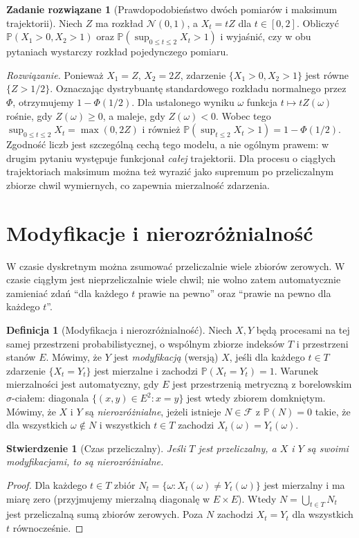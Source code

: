 \documentclass[11pt,a4paper,oneside]{report}
\numberwithin{equation}{chapter}
\theoremstyle{plain}
\newtheorem{stwierdzenie}[twierdzenie]{Stwierdzenie}
\theoremstyle{definition}
\newtheorem{definicja}{Definicja}[chapter]
\newtheorem{zadanie}{Zadanie rozwiązane}[chapter]
\theoremstyle{remark}
\newcommand{\Prob}{\mathbb{P}}
\newcommand{\calF}{\mathcal{F}}
\newcommand{\Normal}{\mathcal{N}}
\begin{document}
\begin{zadanie}[Prawdopodobieństwo dwóch pomiarów i maksimum trajektorii]
Niech $Z$ ma rozkład $\Normal(0,1)$, a $X_t=tZ$ dla
$t\in[0,2]$. Obliczyć $\Prob(X_1>0,X_2>1)$ oraz
$\Prob(\sup_{0\le t\le2}X_t>1)$ i wyjaśnić, czy w obu pytaniach
wystarczy rozkład pojedynczego pomiaru.

\emph{Rozwiązanie.} Ponieważ $X_1=Z$, $X_2=2Z$,
zdarzenie $\{X_1>0,X_2>1\}$ jest równe $\{Z>1/2\}$.
Oznaczając dystrybuantę standardowego rozkładu normalnego przez
$\Phi$, otrzymujemy $1-\Phi(1/2)$.
Dla ustalonego wyniku $\omega$ funkcja $t\mapsto tZ(\omega)$
rośnie, gdy $Z(\omega)\ge0$, a maleje, gdy $Z(\omega)<0$.
Wobec tego $\sup_{0\le t\le2}X_t=\max(0,2Z)$ i również
$\Prob(\sup_{t\le2}X_t>1)=1-\Phi(1/2)$.
Zgodność liczb jest szczególną cechą tego modelu, a nie ogólnym
prawem: w drugim pytaniu występuje funkcjonał \emph{całej}
trajektorii. Dla procesu o ciągłych trajektoriach maksimum można
też wyrazić jako supremum po przeliczalnym zbiorze chwil
wymiernych, co zapewnia mierzalność zdarzenia.
\end{zadanie}

\section{Modyfikacje i nierozróżnialność}
W czasie dyskretnym można zsumować przeliczalnie wiele zbiorów
zerowych. W czasie ciągłym jest nieprzeliczalnie wiele chwil;
nie wolno zatem automatycznie zamieniać zdań ``dla każdego $t$
prawie na pewno'' oraz ``prawie na pewno dla każdego $t$''.

\begin{definicja}[Modyfikacja i nierozróżnialność]
Niech $X,Y$ będą procesami na tej samej przestrzeni probabilistycznej,
o wspólnym zbiorze indeksów $T$ i przestrzeni stanów $E$.
Mówimy, że $Y$ jest \emph{modyfikacją} (wersją) $X$, jeśli
dla każdego $t\in T$ zdarzenie $\{X_t=Y_t\}$ jest mierzalne
i zachodzi $\Prob(X_t=Y_t)=1$.
Warunek mierzalności jest automatyczny, gdy $E$ jest przestrzenią
metryczną z borelowskim $\sigma$-ciałem: diagonala
$\{(x,y)\in E^2:x=y\}$ jest wtedy zbiorem domkniętym.
Mówimy, że $X$ i $Y$ są \emph{nierozróżnialne}, jeżeli istnieje
$N\in\calF$ z $\Prob(N)=0$ takie, że dla wszystkich
$\omega\notin N$ i wszystkich $t\in T$ zachodzi
$X_t(\omega)=Y_t(\omega)$.
\end{definicja}

\begin{stwierdzenie}[Czas przeliczalny]
Jeśli $T$ jest przeliczalny, a $X$ i $Y$ są swoimi
modyfikacjami, to są nierozróżnialne.
\end{stwierdzenie}
\begin{proof}
Dla każdego $t\in T$ zbiór
$N_t=\{\omega:X_t(\omega)\ne Y_t(\omega)\}$ jest mierzalny
i ma miarę zero (przyjmujemy mierzalną diagonalę w $E\times E$).
Wtedy $N=\bigcup_{t\in T}N_t$ jest przeliczalną sumą
zbiorów zerowych. Poza $N$ zachodzi $X_t=Y_t$ dla
wszystkich $t$ równocześnie.
\end{proof}
\end{document}
